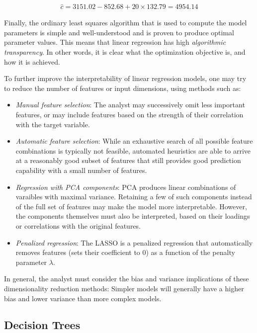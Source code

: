 \begin{align*}
\hat{c} = 3151.02 - 852.68 + 20 \times 132.79 = 4954.14
\end{align*}

Finally, the ordinary least squares algorithm that is used to compute the model parameters is simple and well-understood and is proven to produce optimal parameter values. This means that linear regression has high \emph{algorithmic transparency}. In other words, it is clear what the optimization objective is, and how it is achieved. 

To further improve the interpretability of linear regression models, one may try to reduce the number of features or input dimensions, using methods such as:

\begin{itemize}
   \item \emph{Manual feature selection}: The analyst may successively omit less important features, or may include features based on the strength of their correlation with the target variable. 
   \item \emph{Automatic feature selection}: While an exhaustive search of all possible feature combinations is typically not feasible, automated heuristics are able to arrive at a reasonably good subset of features that still provides good prediction capability with a small number of features.
   \item \emph{Regression with PCA components}: PCA produces linear combinations of varaibles with maximal variance. Retaining a few of such components instead of the full set of features may make the model more interpretable. However, the components themselves must also be interpreted, based on their loadings or correlations with the original features. 
   \item \emph{Penalized regression}: The LASSO is a penalized regression that automatically removes features (sets their coefficient to $0$) as a function of the penalty parameter $\lambda$.
\end{itemize} 

In general, the analyst must consider the bias and variance implications of these dimensionality reduction methods: Simpler models will generally have a higher bias and lower variance than more complex models. 

\subsection{Decision Trees}

